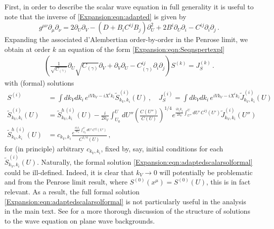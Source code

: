 	First, in order to describe the scalar wave equation in full generality it is useful to note that the inverse of \eqref{Expansion:eqn:adapted} is given by
	\begin{equation}
	g^{\mu \nu}\partial_{\mu}\partial_{\nu} = 2 \partial_U \partial_V - \left(D + B_i C^{ij} B_j\right)\partial^2_U+ 2 B^i \partial_U \partial_i- C^{ij}\partial_i \partial_j \, .
	\end{equation}
	Expanding the associated d'Alembertian order-by-order in the Penrose limit, we obtain at order $k$ an equation of the form \eqref{Expansion:eqn:Seqnspertexpl}
	\begin{equation}
	\begin{aligned}
	\left( \frac{1}{\sqrt{C_{(\gamma)}}}\partial_U \sqrt{C_{(\gamma)}} \partial_V + \partial_V\partial_U  - C_{(\gamma)}^{ij}  \partial_i  \partial_j \right)S^{(k)} = J_S^{(k)} \, .
	\end{aligned}
	\end{equation}
	with (formal) solutions
	\begin{equation}\label{Expansion:eqn:adaptedscalarsolformal}
	\begin{aligned}
	S^{(i)} &= \int dk_V dk_i \, e^{i V k_V -i X^i k_i}\tilde{S}^{(i)}_{k_V, k_i}(U) \, , \quad J_S^{(i)} = \int dk_V dk_i \, e^{i V k_V -i X^i k_i}\tilde{J}^{(i)}_{k_V, k_i}(U) \\
	\tilde{S}^{(i)}_{k_V, k_i}(U) &= \tilde{S}^{h \, (i)}_{k_V, k_i}(U) - \frac{i}{2 k_V} \int^U_{U_0} dU'' \left(\frac{C(U'')}{C(U)}\right)^{1/4} e^{\frac{i k_i k_j}{2 k_V } \int_{U''}^{U} dU' \, C^{ij}(U')} \tilde{J}_{k_V, k_i}^{(i)}(U'') \\
	\tilde{S}^{h \, (i)}_{k_V, k_i}(U) &= c_{k_V, k_i} \frac{e^{\frac{i k_i k_j}{2 k_V} \int_{U_0}^U dU' \, C^{ij}(U')}}{C^{1/4}(U)} \, ,
	\end{aligned}
	\end{equation}
	for (in principle) arbitrary $c_{k_V, k_i}$, fixed by, say, initial conditions for each $\tilde{S}^{(i)}_{k_V, k_i}(U)$. Naturally, the formal solution \eqref{Expansion:eqn:adaptedscalarsolformal} could be ill-defined. Indeed, it is clear that $k_V \to 0$ will potentially be problematic and from the Penrose limit result, where $S^{(0)}(x^{\mu}) = S^{(0)}(U)$, this is in fact relevant. As a result, the full formal solution \eqref{Expansion:eqn:adaptedscalarsolformal} is not particularly useful in the analysis in the main text. See \cite{Ward:1987ws} for a more thorough discussion of the
	structure of solutions to the wave equation on plane wave backgrounds.
	
